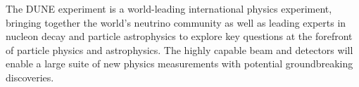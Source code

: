 The DUNE experiment is a world-leading international physics
experiment, bringing together the world's neutrino community as well
as leading experts in nucleon decay and particle astrophysics to
explore key questions at the forefront of particle physics and
astrophysics. The highly capable beam and detectors will enable a
large suite of new physics measurements with potential groundbreaking
discoveries.










